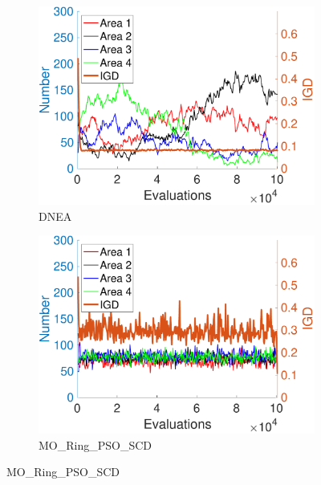 \documentclass[conference]{IEEEtran}
\begin{document}
\begin{figure}[htbp]
    \centering
    \begin{subfigure}[b]{.22\textwidth}
    \includegraphics[width=\linewidth]{Section5/dim2/Diversity/DNEA}
    \caption{DNEA}
    \end{subfigure}
    \begin{subfigure}[b]{.22\textwidth}
    \includegraphics[width=\linewidth]{Section5/dim2/Diversity/MO_Ring_PSO_SCD}
    \caption{MO\_Ring\_PSO\_SCD}
    \end{subfigure}
    

\end{figure}
\end{document}
